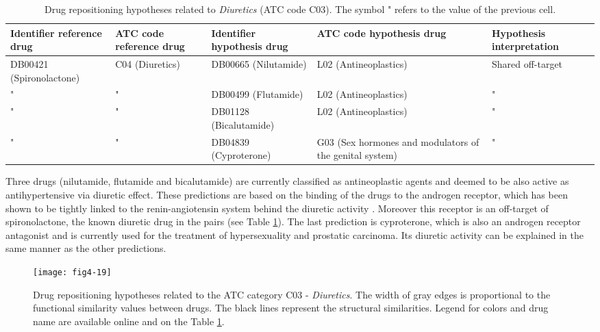 \begin{table}[htbp]
\scriptsize
\begin{tabular}{|p{2cm}|p{2cm}|p{2cm}|p{3cm}|p{4cm}|}
\hline
\textbf{Identifier reference drug} & \textbf{ATC code reference drug} & \textbf{Identifier hypothesis drug} & \textbf{ATC code hypothesis drug} & \textbf{Hypothesis interpretation} \\ \hline
DB00421 (Spironolactone) & C04 (Diuretics) & DB00665 (Nilutamide) & L02 (Antineoplastics) & Shared off-target \\ \hline
" & " & DB00499 (Flutamide) & L02 (Antineoplastics) & " \\ \hline
" & " & DB01128 (Bicalutamide) & L02 (Antineoplastics) & " \\ \hline
" & " & DB04839 (Cyproterone) & G03 (Sex hormones and modulators of the genital system) & " \\ \hline
\end{tabular}
\caption{Drug repositioning hypotheses related to \emph{Diuretics} (ATC code C03). The symbol " refers to the value of the previous cell.}
\label{table:tablec03}
\end{table}

Three drugs (nilutamide, flutamide and bicalutamide) are currently classified as antineoplastic agents and deemed to be also active as antihypertensive via diuretic effect. These predictions are based on the binding of the drugs to the androgen receptor, which has been shown to be tightly linked to the renin-angiotensin system behind the diuretic activity \citep{ikeda2009androgen} \citep{hoshino2011regulation}. Moreover this receptor is an off-target of spironolactone, the known diuretic drug in the pairs (see Table \ref{table:tablec03}). The last prediction is cyproterone, which is also an androgen receptor antagonist and is currently used for the treatment of hypersexuality and prostatic carcinoma. Its diuretic activity can be explained in the same manner as the other predictions.

\begin{figure}[H]
    \centering
    \texttt{[image: fig4-19]}
    \caption{Drug repositioning hypotheses related to the ATC category C03 - \emph{Diuretics}. The width of gray edges is proportional to the functional similarity values between drugs. The black lines represent the structural similarities. Legend for colors and drug name are available online and on the Table \ref{table:tablec03}.}
    \label{fig4-19}
\end{figure}

